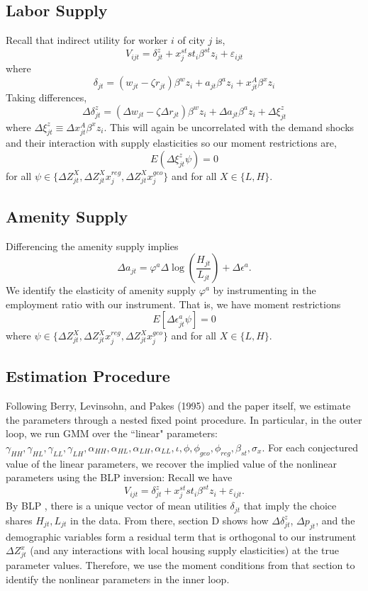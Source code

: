 \documentclass{article}
\begin{document}
\subsection{Labor Supply}

Recall that indirect utility for worker $i$ of city $j$ is,
$$V_{ijt} = \delta_{jt}^z + x_j^{st}st_i\beta^{st}z_i+\varepsilon_{ijt}$$
where
$$\delta_{jt} = (w_{jt}-\zeta r_{jt})\beta^w z_i + a_{jt}\beta^az_i + x_{jt}^A\beta^xz_i$$
Taking differences,
$$\Delta\delta_{jt}^z = (\Delta w_{jt}-\zeta \Delta r_{jt})\beta^w z_i + \Delta a_{jt}\beta^az_i + \Delta\xi_{jt}^z$$
where $\Delta\xi_{jt}^z\equiv \Delta x_{jt}^A\beta^xz_i$. This will again be uncorrelated with the demand shocks and their interaction with supply elasticities so our moment restrictions are,
$$
E(\Delta \xi_{jt}^z \psi) = 0 
$$
for all $\psi \in \{\Delta Z_{jt}^X, \Delta Z_{jt}^X x_j^{reg}, \Delta Z_{jt}^X x_j^{geo}\}$ and for all $X\in\{L,H\}$.


\subsection{Amenity Supply}
Differencing the amenity supply implies 
$$
\Delta a_{jt} = \varphi^a \Delta \log \left(\frac{H_{jt}}{L_{jt}}\right) + \Delta \epsilon^a.
$$
We identify the elasticity of amenity supply $\varphi^a$ by instrumenting in the employment ratio with our instrument. That is, we have moment restrictions $$
E[\Delta\epsilon^a_{jt} \psi] = 0$$
where $\psi \in \{\Delta Z^X_{jt}, \Delta Z_{jt}^X x_j^{reg}, \Delta Z_{jt}^X x_j^{geo}\}$ and for all $X\in\{L,H\}$.

\subsection{Estimation Procedure}

Following Berry, Levinsohn, and Pakes (1995) and the paper itself, we estimate the parameters through a nested fixed point procedure. In particular, in the outer loop, we run GMM over the ``linear" parameters: $\gamma_{HH}, \gamma_{HL}, \gamma_{LL}, \gamma_{LH}, \alpha_{HH}, \alpha_{HL}, \alpha_{LH}, \alpha_{LL},  \iota, \phi, \phi_{geo}, \phi_{reg}, \beta_{st}, \sigma_x$. For each conjectured value of the linear parameters, we recover the implied value of the nonlinear parameters using the BLP inversion:  Recall we have $$V_{ijt} = \delta_{jt}^z + x_j^{st}st_i\beta^{st}z_i + \varepsilon_{ijt}.$$ By BLP , there is a unique vector of mean utilities $\delta_{jt}$ that imply the choice shares $H_{jt}, L_{jt}$ in the data.  From there, section D shows how $\Delta \delta_{jt}^z$, $\Delta p_{jt}$, and the demographic variables form a residual term  that is orthogonal to our instrument $\Delta Z_{jt}^x$ (and any interactions with local housing supply elasticities) at the true parameter values. Therefore, we use the moment conditions from that section to identify the nonlinear parameters in the inner loop. 
\end{document}
